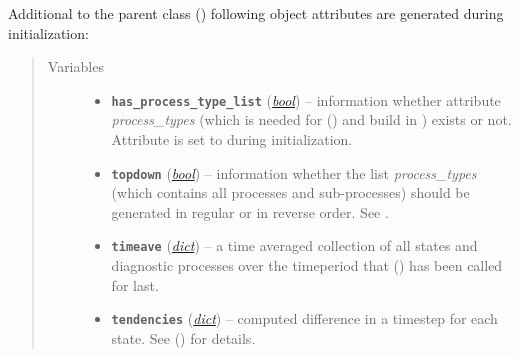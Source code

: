 \documentclass[a4paper,10pt,english]{sphinxmanual}
\begin{document}
\begin{fulllineitems}
Additional to the parent class {\hyperref[api/climlab.process:climlab.process.process.Process]{\emph{}}} ()
following object attributes are generated during initialization:
\begin{quote}\begin{description}
\item[{Variables}] \leavevmode\begin{itemize}
\item {} 
\textbf{\texttt{has\_process\_type\_list}} (\href{http://docs.python.org/2.7/library/functions.html\#bool}{\emph{bool}}) -- information whether attribute \emph{process\_types} 
(which is needed for {\hyperref[api/climlab.process:climlab.process.time_dependent_process.TimeDependentProcess.compute]{\emph{}}} () and build in
)
exists or not. Attribute is set to  
during initialization.

\item {} 
\textbf{\texttt{topdown}} (\href{http://docs.python.org/2.7/library/functions.html\#bool}{\emph{bool}}) -- information whether the list \emph{process\_types} (which 
contains all processes and sub-processes) should be 
generated in regular or in reverse order.
See .

\item {} 
\textbf{\texttt{timeave}} (\href{http://docs.python.org/2.7/library/stdtypes.html\#dict}{\emph{dict}}) -- a time averaged collection of all states and diagnostic 
processes over the timeperiod that 
{\hyperref[api/climlab.process:climlab.process.time_dependent_process.TimeDependentProcess.integrate_years]{\emph{}}} () has been called for last.

\item {} 
\textbf{\texttt{tendencies}} (\href{http://docs.python.org/2.7/library/stdtypes.html\#dict}{\emph{dict}}) -- computed difference in a timestep for each state. 
See {\hyperref[api/climlab.process:climlab.process.time_dependent_process.TimeDependentProcess.compute]{\emph{}}} () for details.


\end{itemize}
\end{description}
\end{quote}
\end{fulllineitems}
\end{document}

